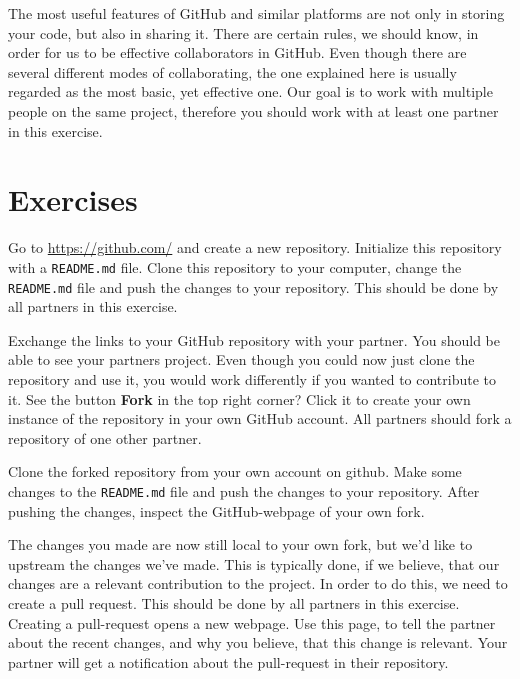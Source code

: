 \documentclass{dcbl/challenge}
\begin{document}
The most useful features of GitHub and similar platforms are not only in storing your code, but also in sharing it.
There are certain rules, we should know, in order for us to be effective collaborators in GitHub.
Even though there are several different modes of collaborating, the one explained here is usually regarded as the most basic, yet effective one.
Our goal is to work with multiple people on the same project, therefore you should work with at least one partner in this exercise.

\section*{Exercises}
\begin{aufgabe}
    Go to \url{https://github.com/} and create a new repository.
    Initialize this repository with a \texttt{README.md} file.
    Clone this repository to your computer, change the \texttt{README.md} file and push the changes to your repository.
    This should be done by all partners in this exercise.
\end{aufgabe}

\begin{aufgabe}
    Exchange the links to your GitHub repository with your partner.
    You should be able to see your partners project. 
    Even though you could now just clone the repository and use it, you would work differently if you wanted to contribute to it.
    See the button \textbf{Fork} in the top right corner?
    Click it to create your own instance of the repository in your own GitHub account.
    All partners should fork a repository of one other partner.
\end{aufgabe}

\begin{aufgabe}
    Clone the forked repository from your own account on github. 
    Make some changes to the \texttt{README.md} file and push the changes to your repository.
    After pushing the changes, inspect the GitHub-webpage of your own fork.
\end{aufgabe}

\begin{aufgabe}
    The changes you made are now still local to your own fork, but we'd like to upstream the changes we've made. 
    This is typically done, if we believe, that our changes are a relevant contribution to the project.
    In order to do this, we need to create a pull request.
    This should be done by all partners in this exercise.
    Creating a pull-request opens a new webpage.
    Use this page, to tell the partner about the recent changes, and why you believe, that this change is relevant.
    Your partner will get a notification about the pull-request in their repository. 
\end{aufgabe}
\end{document}
